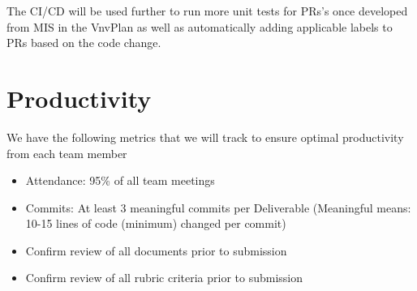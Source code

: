 \documentclass{article}
\begin{document}
The CI/CD will be used further to run more unit tests for PRs's once developed from MIS in the VnvPlan 
as well as automatically adding applicable labels to PRs based on the code change. 

\newpage

\section{Productivity}
We have the following metrics that we will track to ensure optimal productivity from each team member

\begin{itemize}
    \item Attendance: 95\% of all team meetings
    \item Commits: At least 3 meaningful commits per Deliverable (Meaningful means: 10-15 lines of code (minimum) changed per commit)
    \item Confirm review of all documents prior to submission
    \item Confirm review of all rubric criteria prior to submission
  \end{itemize}
\end{document}
